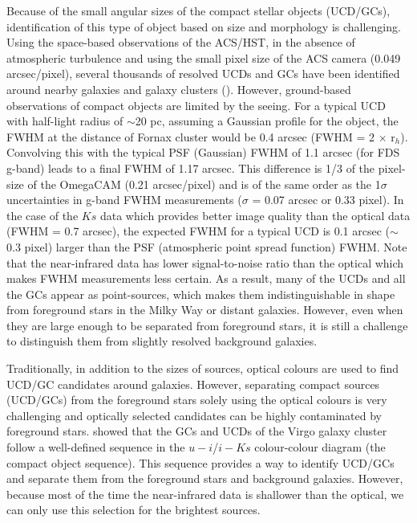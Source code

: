 \documentclass[fleqn,usenatbib]{mnras}
\begin{document}
Because of the small angular sizes of the compact stellar objects (UCD/GCs), identification of this type of object based on size and morphology is challenging. Using the space-based observations of the ACS/HST, in the absence of atmospheric turbulence and using the small pixel size of the ACS camera (0.049 arcsec/pixel), several thousands of resolved UCDs and GCs have been identified around nearby galaxies and galaxy clusters (\citealp{jordan2004,sharina2005,mark,jordan2015}). However, ground-based observations of compact objects are limited by the seeing. For a typical UCD with half-light radius of $\sim$20 pc, assuming a Gaussian profile for the object, the FWHM at the distance of Fornax cluster would be 0.4 arcsec (FWHM = 2 $\times$ r$_h$). Convolving this with the typical PSF (Gaussian) FWHM of 1.1 arcsec (for FDS g-band) leads to a final FWHM of 1.17 arcsec. This difference is 1/3 of the pixel-size of the OmegaCAM (0.21 arcsec/pixel) and is of the same order as the 1$\sigma$ uncertainties in g-band FWHM measurements ($\sigma$ = 0.07 arcsec or 0.33 pixel). In the case of the $Ks$ data which provides better image quality than the optical data (FWHM = 0.7 arcsec), the expected FWHM for a typical UCD is 0.1 arcsec ($\sim$0.3 pixel) larger than the PSF (atmospheric point spread function) FWHM. Note that the near-infrared data has lower signal-to-noise ratio than the optical which makes FWHM measurements less certain. As a result, many of the UCDs and all the GCs appear as point-sources, which makes them indistinguishable in shape from foreground stars in the Milky Way or distant galaxies. However, even when they are large enough to be separated from foreground stars, it is still a challenge to distinguish them from slightly resolved background galaxies. 

Traditionally, in addition to the sizes of sources, optical colours are used to find UCD/GC candidates around galaxies. However, separating compact sources (UCD/GCs) from the foreground stars solely using the optical colours is very challenging and optically selected candidates can be highly contaminated by foreground stars. \citet{Munoz-2014} showed that the GCs and UCDs of the Virgo galaxy cluster follow a well-defined sequence in the $u-i$/$i-Ks$ colour-colour diagram (the compact object sequence). This sequence provides a way to identify UCD/GCs and separate them from the foreground stars and background galaxies. However, because most of the time the near-infrared data is shallower than the optical, we can only use this selection for the brightest sources. 
\end{document}
